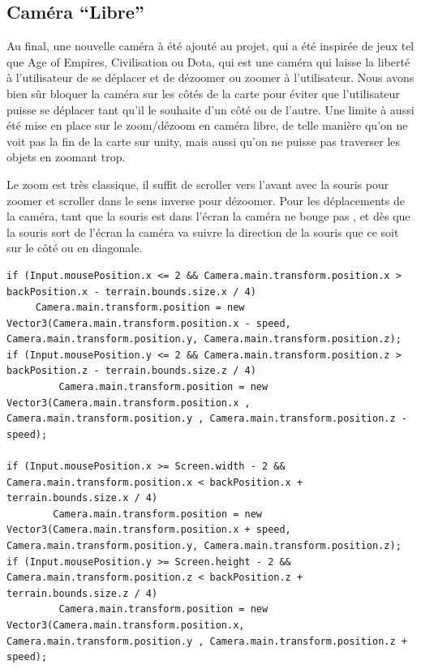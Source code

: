 \documentclass{report}
\begin{document}
\paragraph{}

\subsection{Caméra “Libre”}

Au final, une nouvelle caméra à été ajouté au projet, qui a été inspirée de jeux tel que Age of Empires, Civilisation ou Dota, qui est une caméra qui laisse la liberté à l’utilisateur de se déplacer et de dézoomer ou zoomer à l’utilisateur. Nous avons bien sûr bloquer la caméra sur les côtés de la carte pour éviter que l’utilisateur puisse se déplacer tant qu’il le souhaite d’un côté ou de l’autre.
Une limite à aussi été mise en place sur le zoom/dézoom en caméra libre, de telle manière qu’on ne voit pas la fin de la carte sur unity, mais aussi qu’on ne puisse pas traverser les objets en zoomant trop. 

Le zoom est très classique, il suffit de scroller vers l’avant avec la souris pour zoomer et scroller dans le sens inverse pour dézoomer. Pour les déplacements de la caméra, tant que la souris est dans l’écran la caméra ne bouge pas , et dès que la souris sort de l’écran la caméra va suivre la direction de la souris que ce soit sur le côté ou en diagonale.
\begin{lstlisting}[frame=single]
 if (Input.mousePosition.x <= 2 && Camera.main.transform.position.x > backPosition.x - terrain.bounds.size.x / 4)
     Camera.main.transform.position = new Vector3(Camera.main.transform.position.x - speed, Camera.main.transform.position.y, Camera.main.transform.position.z);
if (Input.mousePosition.y <= 2 && Camera.main.transform.position.z > backPosition.z - terrain.bounds.size.z / 4)
         Camera.main.transform.position = new Vector3(Camera.main.transform.position.x , Camera.main.transform.position.y , Camera.main.transform.position.z - speed);

if (Input.mousePosition.x >= Screen.width - 2 && Camera.main.transform.position.x < backPosition.x + terrain.bounds.size.x / 4)
        Camera.main.transform.position = new Vector3(Camera.main.transform.position.x + speed, Camera.main.transform.position.y, Camera.main.transform.position.z);
if (Input.mousePosition.y >= Screen.height - 2 && Camera.main.transform.position.z < backPosition.z + terrain.bounds.size.z / 4)
         Camera.main.transform.position = new Vector3(Camera.main.transform.position.x, Camera.main.transform.position.y , Camera.main.transform.position.z + speed);
 \end{lstlisting}
\end{document}
